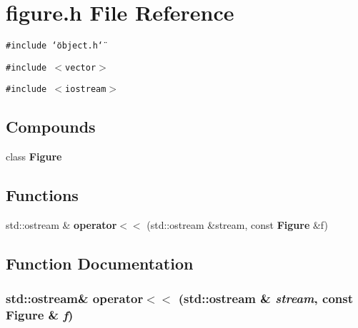 \section{figure.h File Reference}
\label{figure_8h}
{\tt \#include \char`\"{}object.h\char`\"{}}\par
{\tt \#include $<$vector$>$}\par
{\tt \#include $<$iostream$>$}\par
\subsection*{Compounds}
\begin{CompactItemize}
\item 
class {\bf Figure}
\end{CompactItemize}
\subsection*{Functions}
\begin{CompactItemize}
\item 
std::ostream \& {\bf operator$<$$<$} (std::ostream \&stream, const {\bf Figure} \&f)
\end{CompactItemize}


\subsection{Function Documentation}
\subsubsection{\setlength{\rightskip}{0pt plus 5cm}std::ostream\& operator$<$$<$ (std::ostream \& {\em stream}, const {\bf Figure} \& {\em f})\hspace{0.3cm}{\tt  [inline]}}\label{figure_8h_a0}


